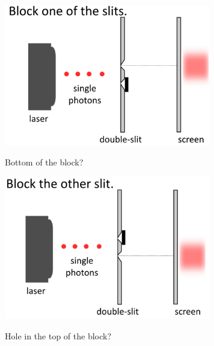 \begin{figure}[H]
   \centering
    \includegraphics[width=0.8\textwidth]{lesson6/block_bottom.pdf}
    \label{fig: 1}
    \begin{center}
        \caption{Bottom of the block?}
    \end{center}
\end{figure}

\begin{figure}[H]
   \centering
    \includegraphics[width=0.8\textwidth]{lesson6/block_top.pdf}
    \label{fig: 1}
    \begin{center}
        \caption{Hole in the top of the block?}
    \end{center}
\end{figure}

